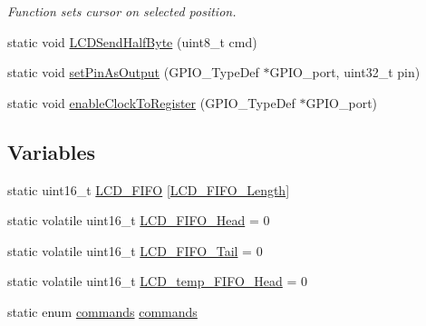 \begin{DoxyCompactItemize}
\begin{DoxyCompactList}\small\item\em Function sets cursor on selected position. \end{DoxyCompactList}\item 
static void \mbox{\hyperlink{group___l_c_d_h_d44780_non_blocking_gaa62a47eb454afaa0aee3359692855962_gaa62a47eb454afaa0aee3359692855962}{L\+C\+D\+Send\+Half\+Byte}} (uint8\+\_\+t cmd)
\item 
static void \mbox{\hyperlink{group___l_c_d_h_d44780_non_blocking_gad4759d75709e2b5bb8d5173a3907a3e6_gad4759d75709e2b5bb8d5173a3907a3e6}{set\+Pin\+As\+Output}} (G\+P\+I\+O\+\_\+\+Type\+Def $\ast$G\+P\+I\+O\+\_\+port, uint32\+\_\+t pin)
\item 
static void \mbox{\hyperlink{group___l_c_d_h_d44780_non_blocking_ga3c470c357442c6697f971a72790975e8_ga3c470c357442c6697f971a72790975e8}{enable\+Clock\+To\+Register}} (G\+P\+I\+O\+\_\+\+Type\+Def $\ast$G\+P\+I\+O\+\_\+port)
\end{DoxyCompactItemize}
\subsection*{Variables}
\begin{DoxyCompactItemize}
\item 
static uint16\+\_\+t \mbox{\hyperlink{group___l_c_d_h_d44780_non_blocking_gaa62bb09e698238df72fba7a50ff83a03_gaa62bb09e698238df72fba7a50ff83a03}{L\+C\+D\+\_\+\+F\+I\+FO}} \mbox{[}\mbox{\hyperlink{group___l_c_d_h_d44780_non_blocking_gabadb170a13a0a14adb963ef388742618_gabadb170a13a0a14adb963ef388742618}{L\+C\+D\+\_\+\+F\+I\+F\+O\+\_\+\+Length}}\mbox{]}
\item 
static volatile uint16\+\_\+t \mbox{\hyperlink{group___l_c_d_h_d44780_non_blocking_gab388d874385a511081bc7a267699c48d_gab388d874385a511081bc7a267699c48d}{L\+C\+D\+\_\+\+F\+I\+F\+O\+\_\+\+Head}} = 0
\item 
static volatile uint16\+\_\+t \mbox{\hyperlink{group___l_c_d_h_d44780_non_blocking_gaa1193bb5f4050455e598080e36fcb9d8_gaa1193bb5f4050455e598080e36fcb9d8}{L\+C\+D\+\_\+\+F\+I\+F\+O\+\_\+\+Tail}} = 0
\item 
static volatile uint16\+\_\+t \mbox{\hyperlink{group___l_c_d_h_d44780_non_blocking_gae140fd1f500bd0a2868190e2057c7e51_gae140fd1f500bd0a2868190e2057c7e51}{L\+C\+D\+\_\+temp\+\_\+\+F\+I\+F\+O\+\_\+\+Head}} = 0
\item 
static enum \mbox{\hyperlink{group___l_c_d_h_d44780_non_blocking_ga033f2c2ba101d1649bd36de7783782f0_ga033f2c2ba101d1649bd36de7783782f0}{commands}} \mbox{\hyperlink{group___l_c_d_h_d44780_non_blocking_gad6f985b808b613c39920e86b7465cfbf_gad6f985b808b613c39920e86b7465cfbf}{commands}}
\end{DoxyCompactItemize}


